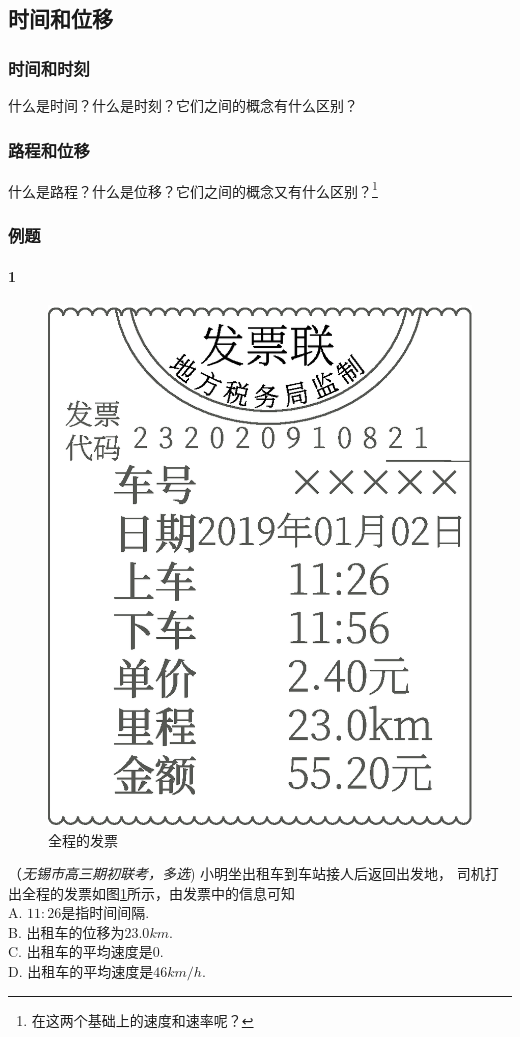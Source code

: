 		\subsection{时间和位移}
			\subsubsection*{时间和时刻}
				什么是时间？什么是时刻？它们之间的概念有什么区别？
			\subsubsection*{路程和位移}
				什么是路程？什么是位移？它们之间的概念又有什么区别？\footnote{在这两个基础上的速度和速率呢？}
			\subsubsection{例题}
				\paragraph{1}
					\begin{figure}
						\centering
						\includegraphics[scale=0.35]{PIC/002.eps}
						\caption{全程的发票}
						\label{Pic::全程的发票}
					\end{figure}
					（\emph{无锡市高三期初联考，多选})
					小明坐出租车到车站接人后返回出发地，
					司机打出全程的发票如图\ref{Pic::全程的发票}所示，由发票中的信息可知\mathc\\
					A. $11:26$是指时间间隔.\\
					B. 出租车的位移为$23.0 km$.\\
					C. 出租车的平均速度是$0$.\\
					D. 出租车的平均速度是$46 km/h$.\\
